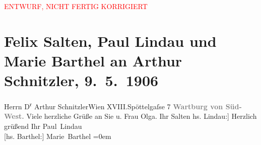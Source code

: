 
\begin{center}
            \textcolor{red}{ENTWURF, NICHT FERTIG KORRIGIERT}
                      \end{center}
            
         
         \renewcommand{\erwaehntePersonen}{Personen: Olga Schnitzler}
         \renewcommand{\erwaehnteOrte}{Orte: Edmund-Weiß-Gasse, Wartburg, Wien, XVIII., Währing}
         \renewcommand{\erwaehnteWerke}{}
               \section[Felix Salten, Paul Lindau und Marie Barthel an Arthur Schnitzler, 9. 5. 1906]{ Felix Salten, Paul Lindau und Marie Barthel an Arthur Schnitzler,
               9. 5. 1906}\nopagebreak{}\rehead{ }\begin{ledgroupsized}[t]{13cm}\normalsize\beginnumbering \toendnotes[C]{\smallbreak\pagebreak[2]} 
\pstart{}{\pb}Herrn D\textsuperscript{r} Arthur Schnitzler\pend{}\pstart{}Wien XVIII.\pend{}\pstart{}Spöttelgaſse 7\pend{}{\bigskip}\pstart
           \noindent{}\centering{}{\pb}\textcolor{gray}{\textbf{Wartburg von
                     Süd-West.}}\pend
           \pstart
           Viele herzliche Grüße an Sie u. Frau Olga.\pend
           \pstart Ihr \spacefill\mbox{Salten}\pend{}\pstart
           \noindent{}{[}hs. Lindau:{]} Herzlich grüßend\pend
           \pstart
           Ihr \spacefill\mbox{Paul Lindau}{\\[\baselineskip]}{[}hs. Barthel:{]} \spacefill\mbox{Marie Barthel}\pend
           \leftskip=0em{}
         
         \endnumbering{}\end{ledgroupsized}\begin{anhang}\end{anhang}\newcommand{\dateiname}{L03423}\newcommand{\titel}{Felix Salten, Paul Lindau und Marie Barthel an Arthur Schnitzler, 9. 5. 1906}\newcommand{\editorInnen}{Martin Anton Müller und Laura Untner}
      
